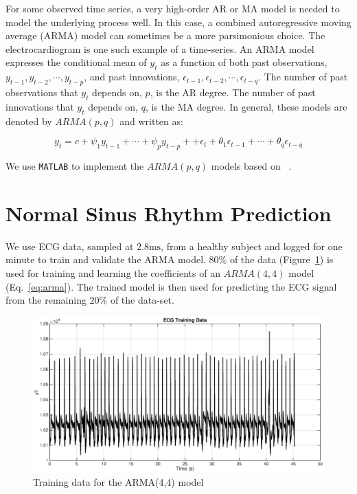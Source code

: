 \documentclass[letter, 10pt, journal]{elsarticle}
\theoremstyle{definition}
\begin{document}
For some observed time series, a very high-order AR or MA model is needed to model the underlying process well. In this case, a combined autoregressive moving average (ARMA) model can sometimes be a more parsimonious choice. The electrocardiogram is one such example of a time-series. 
An ARMA model expresses the conditional mean of $y_t$ as a function of both past observations, $y_{t−1},y_{t−2},\cdots,y_{t−p}$, and past innovations, $\epsilon_{t−1},\epsilon_{t−2},\cdots,\epsilon_{t−q}$.
The number of past observations that $y_t$ depends on, $p$, is the AR degree. 
The number of past innovations that $y_t$ depends on, $q$, is the MA degree. 
In general, these models are denoted by $ARMA(p,q)$ and written as:

\begin{equation}
y_t = c + \psi_1 y_{t-1} + \cdots + \psi_p y_{t-p} + + \epsilon_t+ \theta_1 \epsilon_{t-1} + \cdots + \theta_q \epsilon_{t-q} 
\label{eq:arma}
\end{equation}

We use \texttt{MATLAB} to implement the $ARMA(p,q)$ models based on ~\cite{wold1954analysis,hamilton1994time}.

\section{Normal Sinus Rhythm Prediction}

We use ECG data, sampled at $2.8\si{\milli\second}$, from a healthy subject and logged for one minute to train and validate the ARMA model.
$80\%$ of the data (Figure~\ref{fig:training}) is used for training and learning the coefficients of an $ARMA(4,4)$ model (Eq.~\ref{eq:arma}).
The trained model is then used for predicting the ECG signal from the remaining $20\%$ of the data-set.
 
\begin{figure}
\centering
\includegraphics[width=\columnwidth]{training.eps}
\caption{Training data for the ARMA(4,4) model}
\label{fig:training}
\end{figure}
\end{document}
